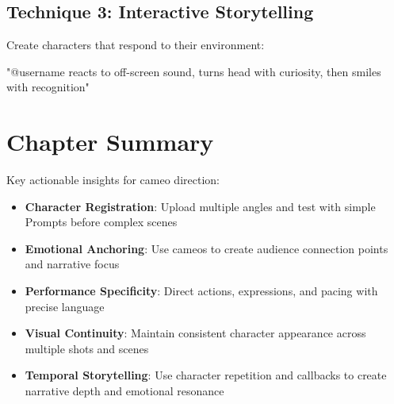 \subsection*{Technique 3: Interactive Storytelling}
Create characters that respond to their environment:
\begin{Prompt}
"@username reacts to off-screen sound, turns head with curiosity, then smiles with recognition"
\end{Prompt}

\section*{Chapter Summary}

Key actionable insights for cameo direction:

\begin{itemize}
\item \textbf{Character Registration}: Upload multiple angles and test with simple Prompts before complex scenes
\item \textbf{Emotional Anchoring}: Use cameos to create audience connection points and narrative focus
\item \textbf{Performance Specificity}: Direct actions, expressions, and pacing with precise language
\item \textbf{Visual Continuity}: Maintain consistent character appearance across multiple shots and scenes
\item \textbf{Temporal Storytelling}: Use character repetition and callbacks to create narrative depth and emotional resonance
\end{itemize}
